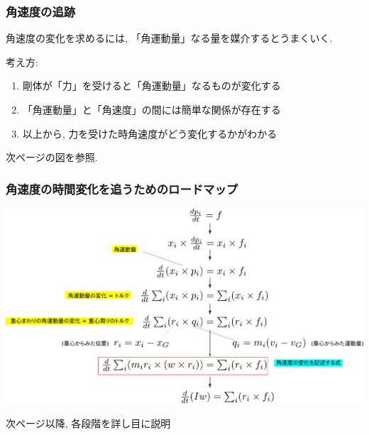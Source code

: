 \documentclass[10pt,dvipdfmx]{beamer}
\newcommand{\ao}[1]{{\color{blue}#1}}
\newcommand{\aka}[1]{{\color{red}#1}}
\begin{document}
\begin{frame}[fragile]
\frametitle{角速度の追跡}

\ao{角速度}の変化を求めるには, 
\aka{「角運動量」}なる量を媒介するとうまくいく.

考え方:
\begin{enumerate}
\item 剛体が「力」を受けると「角運動量」なるものが変化する
\item 「角運動量」と「角速度」の間には簡単な関係が存在する
\item 以上から, 力を受けた時角速度がどう変化するかがわかる
\end{enumerate}

次ページの図を参照.

\end{frame}

\begin{frame}
\frametitle{角速度の時間変化を追うためのロードマップ}

\includegraphics[width=\textwidth]{out/pdf/svg/rigid_roadmap.pdf}

次ページ以降, 各段階を詳し目に説明
\end{frame}
\end{document}
